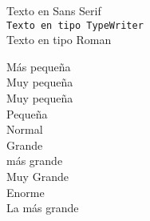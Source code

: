 \documentclass[12pt]{book}
\begin{document}
\begin{center}
\textsf{Texto en Sans Serif} \\
\texttt{Texto en tipo TypeWriter}\\
\textrm{Texto en tipo Roman}\\
\end{center}
\scriptsize M\'as peque\~na \\[1cm]
\tiny Muy peque\~na \\[1cm]
\footnotesize Muy peque\~na \\[1cm]
\small Peque\~na \\[1cm]
\normalsize Normal \\[1cm]
\large Grande \\[1cm]
\Large m\'as grande \\[1cm]
\LARGE Muy Grande  \\[1cm]
\huge Enorme  \\[1cm]
\Huge La m\'as grande \\[1cm]
\end{document}
